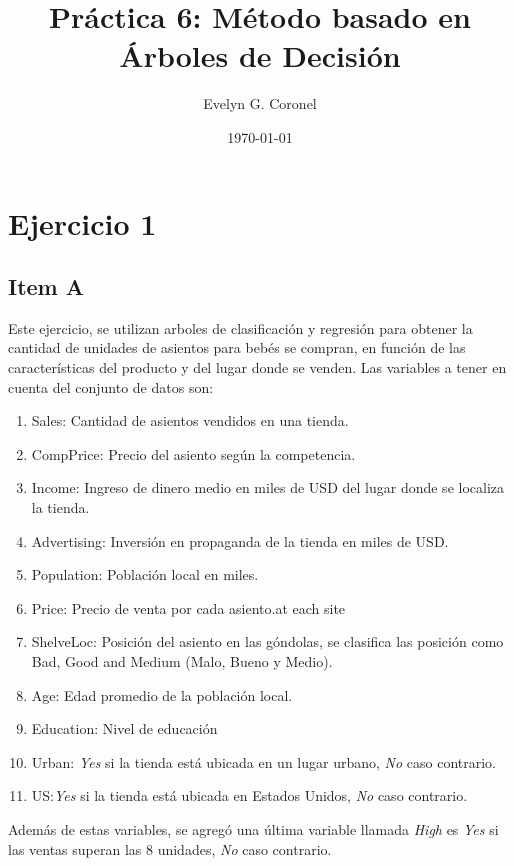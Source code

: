 
\usepackage{multirow}


\title{Práctica 6: Método basado en Árboles de Decisión}
\author{Evelyn G. Coronel}


\date[]{\lowercase{\today}} 

\maketitle

\section*{Ejercicio 1}


\subsection*{Item A}
Este ejercicio, se utilizan arboles de clasificación y regresión para obtener la cantidad de unidades de asientos para bebés se compran, en función de las características del producto y del lugar donde se venden. Las variables a tener en cuenta del conjunto de datos son:

\begin{enumerate}
    \item Sales: Cantidad de asientos vendidos en una tienda.
    \item CompPrice: Precio del asiento según la competencia.
    \item Income: Ingreso de dinero medio en miles de USD del lugar donde se localiza la tienda.
    \item Advertising: Inversión en propaganda de la tienda en  miles de USD.
    \item Population: Población local en miles.
    \item Price: Precio de venta por cada asiento.at each site
    \item ShelveLoc: Posición del asiento en las góndolas, se clasifica las posición como Bad, Good and Medium  (Malo, Bueno y Medio).
    \item Age: Edad promedio de la población local.
    \item Education: Nivel de educación
    \item Urban: \emph{Yes} si la tienda está ubicada en un lugar urbano, \emph{No} caso contrario.
    \item US:\emph{Yes} si la tienda está ubicada en Estados Unidos, \emph{No} caso contrario.    
\end{enumerate}
Además de estas variables, se agregó una última variable llamada \emph{High} es \emph{Yes} si las ventas superan las $8$ unidades, \emph{No} caso contrario. 


